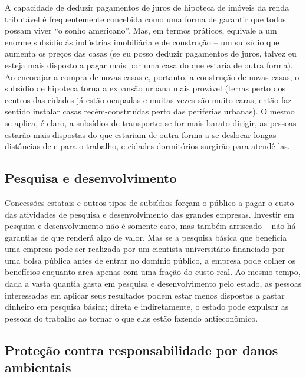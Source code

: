 A capacidade de deduzir pagamentos de juros de hipoteca de imóveis da renda tributável é frequentemente concebida como uma forma de garantir que todos possam viver ``o sonho americano''. Mas, em termos práticos, equivale a um enorme subsídio às indústrias imobiliária e de construção -- um subsídio que aumenta os preços das casas (se eu posso deduzir pagamentos de juros, talvez eu esteja mais disposto a pagar mais por uma casa do que estaria de outra forma). Ao encorajar a compra de novas casas e, portanto, a construção de novas casas, o subsídio de hipoteca torna a expansão urbana mais provável (terras perto dos centros das cidades já estão ocupadas e muitas vezes são muito caras, então faz sentido instalar casas recém-construídas perto das periferias urbanas). O mesmo se aplica, é claro, a subsídios de transporte: se for mais barato dirigir, as pessoas estarão mais dispostas do que estariam de outra forma a se deslocar longas distâncias de e para o trabalho, e cidades-dormitórios surgirão para atendê-las.

\subsection*{Pesquisa e desenvolvimento}

Concessões estatais e outros tipos de subsídios forçam o público a pagar o custo das atividades de pesquisa e desenvolvimento das grandes empresas. Investir em pesquisa e desenvolvimento não é somente caro, mas também arriscado -- não há garantias de que renderá algo de valor. Mas se a pesquisa básica que beneficia uma empresa pode ser realizada por um cientista universitário financiado por uma bolsa pública antes de entrar no domínio público, a empresa pode colher os benefícios enquanto arca apenas com uma fração do custo real. Ao mesmo tempo, dada a vasta quantia gasta em pesquisa e desenvolvimento pelo estado, as pessoas interessadas em aplicar seus resultados podem estar menos dispostas a gastar dinheiro em pesquisa básica; direta e indiretamente, o estado pode expulsar as pessoas do trabalho ao tornar o que elas estão fazendo antieconômico.

\subsection*{Proteção contra responsabilidade por danos ambientais}

